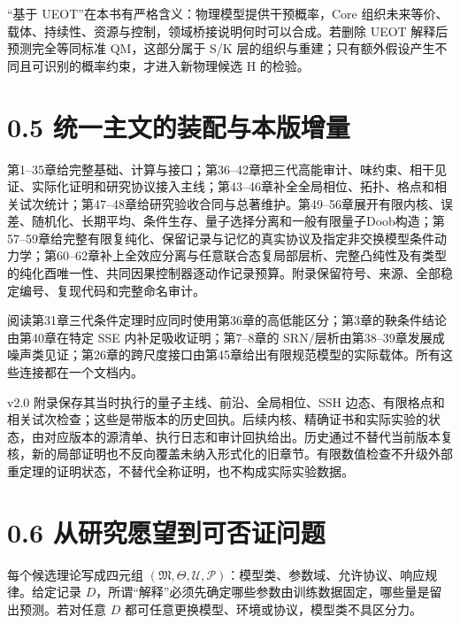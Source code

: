 \documentclass[
  11pt,
  oneside]{book}
\begin{document}
``基于 UEOT''在本书有严格含义：物理模型提供干预概率，Core
组织未来等价、载体、持续性、资源与控制，领域桥接说明何时可以合成。若删除
UEOT 解释后预测完全等同标准 QM，这部分属于 S/K
层的组织与重建；只有额外假设产生不同且可识别的概率约束，才进入新物理候选
H 的检验。

\hypertarget{ux7edfux4e00ux4e3bux6587ux7684ux88c5ux914dux4e0eux672cux7248ux589eux91cf}{%
\section{0.5
统一主文的装配与本版增量}\label{ux7edfux4e00ux4e3bux6587ux7684ux88c5ux914dux4e0eux672cux7248ux589eux91cf}}

第1--35章给完整基础、计算与接口；第36--42章把三代高能审计、味约束、相干见证、实际化证明和研究协议接入主线；第43--46章补全全局相位、拓扑、格点和相关试次统计；第47--48章给研究验收合同与总著维护。第49--56章展开有限内核、误差、随机化、长期平均、条件生存、量子选择分离和一般有限量子Doob构造；第57--59章给完整有限复纯化、保留记录与记忆的真实协议及指定非交换模型条件动力学；第60--62章补上全效应分离与任意联合态复局部层析、完整凸纯性及有类型的纯化酉唯一性、共同因果控制器逐动作记录预算。附录保留符号、来源、全部稳定编号、复现代码和完整命名审计。

阅读第31章三代条件定理时应同时使用第36章的高低能区分；第3章的鞅条件结论由第40章在特定
SSE 内补足吸收证明；第7--8章的
SRN/层析由第38--39章发展成噪声类见证；第26章的跨尺度接口由第45章给出有限规范模型的实际载体。所有这些连接都在一个文档内。

v2.0 附录保存其当时执行的量子主线、前沿、全局相位、SSH
边态、有限格点和相关试次检查；这些是带版本的历史回执。后续内核、精确证书和实际实验的状态，由对应版本的源清单、执行日志和审计回执给出。历史通过不替代当前版本复核，新的局部证明也不反向覆盖未纳入形式化的旧章节。有限数值检查不升级外部重定理的证明状态，不替代全称证明，也不构成实际实验数据。

\hypertarget{ux4eceux7814ux7a76ux613fux671bux5230ux53efux5426ux8bc1ux95eeux9898}{%
\section{0.6
从研究愿望到可否证问题}\label{ux4eceux7814ux7a76ux613fux671bux5230ux53efux5426ux8bc1ux95eeux9898}}

每个候选理论写成四元组
\((\mathfrak M,\Theta,\mathcal U,\mathcal P)\)：模型类、参数域、允许协议、响应规律。给定记录
\(D\)，所谓``解释''必须先确定哪些参数由训练数据固定，哪些量是留出预测。若对任意
\(D\) 都可任意更换模型、环境或协议，模型类不具区分力。
\end{document}
